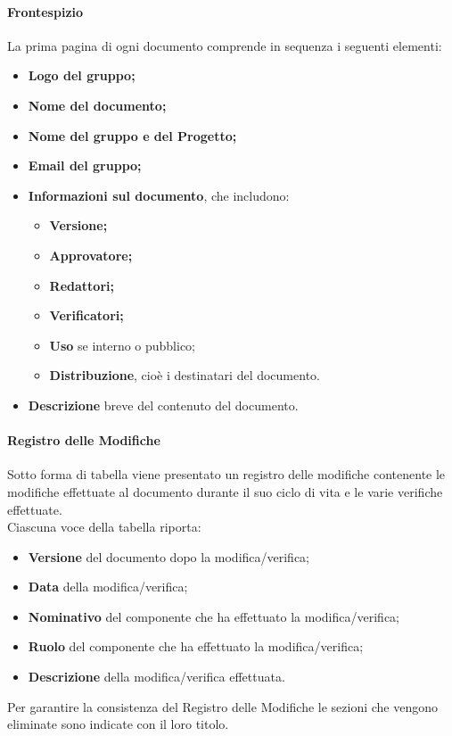 \paragraph*{Frontespizio}
La prima pagina di ogni documento comprende in sequenza i seguenti elementi:
\begin{itemize}
	\item \textbf{Logo del gruppo; }
	\item \textbf{Nome del documento;}
	\item \textbf{Nome del gruppo e del Progetto;}
	\item \textbf{Email del gruppo;}
	\item \textbf{Informazioni sul documento}, che includono:
		\begin{itemize}
			\item \textbf{Versione;}
			\item \textbf{Approvatore;}
			\item \textbf{Redattori;}
			\item \textbf{Verificatori;}
			\item \textbf{Uso} se interno o pubblico;
			\item \textbf{Distribuzione}, cioè i destinatari del documento.
		\end{itemize}
	\item \textbf{Descrizione} breve del contenuto del documento.
\end{itemize}

\paragraph*{Registro delle Modifiche}
Sotto forma di tabella viene presentato un registro delle modifiche contenente le modifiche effettuate al documento durante il suo ciclo di vita e le varie verifiche effettuate.\\
Ciascuna voce della tabella riporta:
\begin{itemize}
	\item \textbf{Versione} del documento dopo la modifica/verifica;
	\item \textbf{Data} della modifica/verifica;
	\item \textbf{Nominativo} del componente che ha effettuato la modifica/verifica;
	\item \textbf{Ruolo} del componente che ha effettuato la modifica/verifica;
	\item \textbf{Descrizione} della modifica/verifica effettuata.
\end{itemize}
Per garantire la consistenza del Registro delle Modifiche le sezioni che vengono eliminate sono indicate con il loro titolo.

